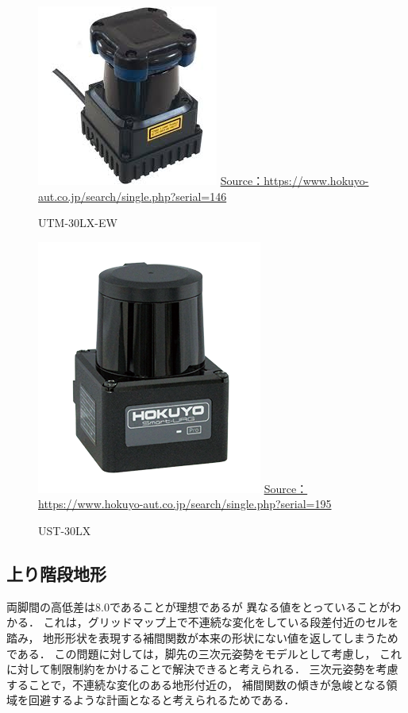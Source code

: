 \documentclass[autodetect-engine,dvipdfmx-if-dvi,ja=standard,a4j,jbase=11pt,magstyle=nomag*]{bxjsreport}
\begin{document}
\begin{figure}[b]
    \centering
    \includegraphics[width=0.6\linewidth, clip]{./figure/chapter4/lidar1.jpg}
    \url{Source：https://www.hokuyo-aut.co.jp/search/single.php?serial=146}
    \caption{UTM-30LX-EW}
    \label{fig:lidar1}
\end{figure}

\begin{figure}[b]
    \centering
    \includegraphics[width=0.6\linewidth, clip]{./figure/chapter4/lidar2.png}
    \url{Source：https://www.hokuyo-aut.co.jp/search/single.php?serial=195}
    \caption{UST-30LX}
    \label{fig:lidar2}
\end{figure}

\subsection{上り階段地形}


両脚間の高低差は$8.0$であることが理想であるが
異なる値をとっていることがわかる．
これは，グリッドマップ上で不連続な変化をしている段差付近のセルを踏み，
地形形状を表現する補間関数が本来の形状にない値を返してしまうためである．
この問題に対しては，脚先の三次元姿勢をモデルとして考慮し，
これに対して制限制約をかけることで解決できると考えられる．
三次元姿勢を考慮することで，不連続な変化のある地形付近の，
補間関数の傾きが急峻となる領域を回避するような計画となると考えられるためである．
\end{document}
